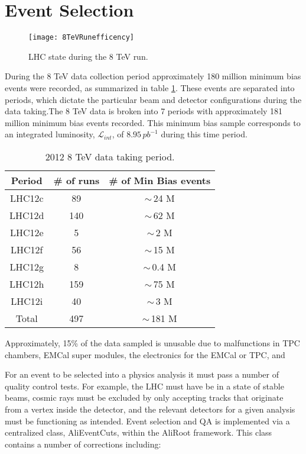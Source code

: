\section{Event Selection}


\begin{figure}[h]
\texttt{[image: 8TeVRunefficency]}
\centering
\caption{LHC state during the 8 TeV run. }
\label{fig:RunEff}
\end{figure}

During the 8 TeV data collection period approximately 180 million minimum bias events were recorded, as summarized in table \ref{tab:RunSummary}.  These events are separated into periods, which dictate the particular beam and detector configurations during the data taking.The 8 TeV data is broken into 7 periods with approximately 181 million minimum bias events recorded.  This minimum bias sample corresponds to an integrated luminosity, $\mathscr{L}_{int}$, of $8.95 \, pb^{-1}$ during this time period\cite{ALICE-PUBLIC-2017-002}.

\begin{table}[hb]
\label{tab:RunSummary}
\begin{center}
\begin{tabular}[b]{|c|c|c|}
	\hline
	Period & \# of runs & \# of Min Bias events \\ \hline
	LHC12c & 89 & $\sim \,$24 M \\ \hline
	LHC12d & 140 & $\sim \,$62 M \\ \hline
	LHC12e & 5 & $\sim \,$2 M \\ \hline
	LHC12f & 56 & $\sim \,$15 M \\ \hline
	LHC12g & 8 & $\sim \,$0.4 M \\ \hline
	LHC12h & 159 & $\sim \,$75 M \\ \hline
	LHC12i & 40 & $\sim \,$3 M \\ \hline
	Total & 497 & $\sim \,$181 M \\ \hline

\end{tabular}
\end{center}
\caption{2012 8 TeV data taking period.}
\end{table}

Approximately, 15\% of the data sampled is unusable due to malfunctions in TPC chambers, EMCal super modules, the electronics for the EMCal or TPC, and   

For an event to be selected into a physics analysis it must pass a number of quality control tests.  For example, the LHC must have be in a state of stable beams, cosmic rays must be excluded by only accepting tracks that originate from a vertex inside the detector, and the relevant detectors for a given analysis must be functioning as intended.  Event selection and QA is implemented via a centralized class, AliEventCuts, within the AliRoot framework.  This class contains a number of corrections including:

